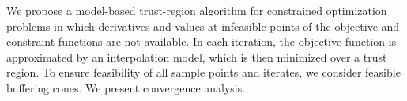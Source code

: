
We propose a model-based trust-region algorithm for constrained optimization problems 
in which derivatives and values at infeasible points of the objective and constraint functions are not available.
In each iteration, the objective function is approximated by an interpolation model, which is then minimized over a trust region.
To ensure feasibility of all sample points and iterates, we consider feasible buffering cones.
We present convergence analysis.
